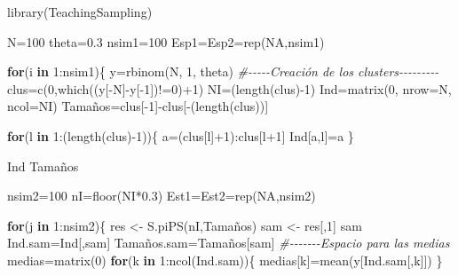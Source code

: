 \documentclass[
  12pt,
]{book}
\newenvironment{Shaded}{\begin{snugshade}}{\end{snugshade}}
\newcommand{\AttributeTok}[1]{\textcolor[rgb]{0.77,0.63,0.00}{#1}}
\newcommand{\CommentTok}[1]{\textcolor[rgb]{0.56,0.35,0.01}{\textit{#1}}}
\newcommand{\ConstantTok}[1]{\textcolor[rgb]{0.00,0.00,0.00}{#1}}
\newcommand{\ControlFlowTok}[1]{\textcolor[rgb]{0.13,0.29,0.53}{\textbf{#1}}}
\newcommand{\DecValTok}[1]{\textcolor[rgb]{0.00,0.00,0.81}{#1}}
\newcommand{\FloatTok}[1]{\textcolor[rgb]{0.00,0.00,0.81}{#1}}
\newcommand{\FunctionTok}[1]{\textcolor[rgb]{0.00,0.00,0.00}{#1}}
\newcommand{\NormalTok}[1]{#1}
\newcommand{\OtherTok}[1]{\textcolor[rgb]{0.56,0.35,0.01}{#1}}
\newcommand{\SpecialCharTok}[1]{\textcolor[rgb]{0.00,0.00,0.00}{#1}}
\begin{document}
\begin{Shaded}
\begin{Highlighting}[]
\FunctionTok{library}\NormalTok{(TeachingSampling)}

\NormalTok{N}\OtherTok{=}\DecValTok{100}
\NormalTok{theta}\OtherTok{=}\FloatTok{0.3}
\NormalTok{nsim1}\OtherTok{=}\DecValTok{100}
\NormalTok{Esp1}\OtherTok{=}\NormalTok{Esp2}\OtherTok{=}\FunctionTok{rep}\NormalTok{(}\ConstantTok{NA}\NormalTok{,nsim1)}

\ControlFlowTok{for}\NormalTok{(i }\ControlFlowTok{in} \DecValTok{1}\SpecialCharTok{:}\NormalTok{nsim1)\{}
\NormalTok{y}\OtherTok{=}\FunctionTok{rbinom}\NormalTok{(N, }\DecValTok{1}\NormalTok{, theta)}
\CommentTok{\#{-}{-}{-}{-}{-}Creación de los clusters{-}{-}{-}{-}{-}{-}{-}{-}{-}}
\NormalTok{clus}\OtherTok{=}\FunctionTok{c}\NormalTok{(}\DecValTok{0}\NormalTok{,}\FunctionTok{which}\NormalTok{((y[}\SpecialCharTok{{-}}\NormalTok{N]}\SpecialCharTok{{-}}\NormalTok{y[}\SpecialCharTok{{-}}\DecValTok{1}\NormalTok{])}\SpecialCharTok{!=}\DecValTok{0}\NormalTok{)}\SpecialCharTok{+}\DecValTok{1}\NormalTok{)}
\NormalTok{NI}\OtherTok{=}\NormalTok{(}\FunctionTok{length}\NormalTok{(clus)}\SpecialCharTok{{-}}\DecValTok{1}\NormalTok{)}
\NormalTok{Ind}\OtherTok{=}\FunctionTok{matrix}\NormalTok{(}\DecValTok{0}\NormalTok{, }\AttributeTok{nrow=}\NormalTok{N, }\AttributeTok{ncol=}\NormalTok{NI)}
\NormalTok{Tamaños}\OtherTok{=}\NormalTok{clus[}\SpecialCharTok{{-}}\DecValTok{1}\NormalTok{]}\SpecialCharTok{{-}}\NormalTok{clus[}\SpecialCharTok{{-}}\NormalTok{(}\FunctionTok{length}\NormalTok{(clus))]}

\ControlFlowTok{for}\NormalTok{(l }\ControlFlowTok{in} \DecValTok{1}\SpecialCharTok{:}\NormalTok{(}\FunctionTok{length}\NormalTok{(clus)}\SpecialCharTok{{-}}\DecValTok{1}\NormalTok{))\{}
\NormalTok{a}\OtherTok{=}\NormalTok{(clus[l]}\SpecialCharTok{+}\DecValTok{1}\NormalTok{)}\SpecialCharTok{:}\NormalTok{clus[l}\SpecialCharTok{+}\DecValTok{1}\NormalTok{]}
\NormalTok{Ind[a,l]}\OtherTok{=}\NormalTok{a}
\NormalTok{\}}

\NormalTok{Ind}
\NormalTok{Tamaños}

\NormalTok{nsim2}\OtherTok{=}\DecValTok{100}
\NormalTok{nI}\OtherTok{=}\FunctionTok{floor}\NormalTok{(NI}\SpecialCharTok{*}\FloatTok{0.3}\NormalTok{)}
\NormalTok{Est1}\OtherTok{=}\NormalTok{Est2}\OtherTok{=}\FunctionTok{rep}\NormalTok{(}\ConstantTok{NA}\NormalTok{,nsim2)}

\ControlFlowTok{for}\NormalTok{(j }\ControlFlowTok{in} \DecValTok{1}\SpecialCharTok{:}\NormalTok{nsim2)\{}
\NormalTok{res }\OtherTok{\textless{}{-}} \FunctionTok{S.piPS}\NormalTok{(nI,Tamaños)}
\NormalTok{sam }\OtherTok{\textless{}{-}}\NormalTok{ res[,}\DecValTok{1}\NormalTok{] }
\NormalTok{sam}
\NormalTok{Ind.sam}\OtherTok{=}\NormalTok{Ind[,sam]}
\NormalTok{Tamaños.sam}\OtherTok{=}\NormalTok{Tamaños[sam]}
\CommentTok{\#{-}{-}{-}{-}{-}{-}{-}Espacio para las medias}
\NormalTok{medias}\OtherTok{=}\FunctionTok{matrix}\NormalTok{(}\DecValTok{0}\NormalTok{)}
\ControlFlowTok{for}\NormalTok{(k }\ControlFlowTok{in} \DecValTok{1}\SpecialCharTok{:}\FunctionTok{ncol}\NormalTok{(Ind.sam))\{}
\NormalTok{medias[k]}\OtherTok{=}\FunctionTok{mean}\NormalTok{(y[Ind.sam[,k]])}
\NormalTok{\}}


\end{Highlighting}
\end{Shaded}
\end{document}
